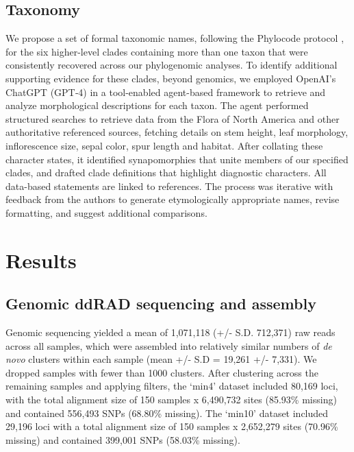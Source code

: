 \documentclass[11pt]{article}
\begin{document}
\subsection{Taxonomy}
We propose a set of formal taxonomic names, following the Phylocode protocol \citep{deQueiroz2020phylo}, for the six higher-level clades containing more than one taxon that were consistently recovered across our phylogenomic analyses.
To identify additional supporting evidence for these clades, beyond genomics, we employed OpenAI's ChatGPT (GPT‑4) in a tool-enabled agent-based framework to retrieve and analyze morphological descriptions for each taxon. The agent performed structured searches to retrieve data from the Flora of North America \citep{Warnock_1997_FNA_Delphinium} and other authoritative referenced sources, fetching details on stem height, leaf morphology, inflorescence size, sepal color, spur length and habitat. After collating these character states, it identified synapomorphies that unite members of our specified clades, and  drafted clade definitions that highlight diagnostic characters. All data-based statements are linked to references. The process was iterative with feedback from the authors to generate etymologically appropriate names, revise formatting, and suggest additional comparisons. 


\section{Results}
\subsection{Genomic ddRAD sequencing and assembly}
Genomic sequencing yielded a mean of 1,071,118 (+/- S.D. 712,371) raw reads 
across all samples, which were assembled into relatively similar numbers of 
\emph{de novo} clusters within each sample (mean +/- S.D = 19,261 +/- 7,331). 
% 
We dropped samples with fewer than 1000 clusters. 
After clustering across the remaining samples and applying filters, 
the `min4' dataset included 80,169 loci, with the total alignment size of
150 samples x 6,490,732 sites (85.93\% missing) and contained 556,493 
SNPs (68.80\% missing). 
The `min10' dataset included 29,196 loci with a total alignment size of 
150 samples x 2,652,279 sites (70.96\% missing) and contained 399,001 SNPs
(58.03\% missing).
\end{document}
